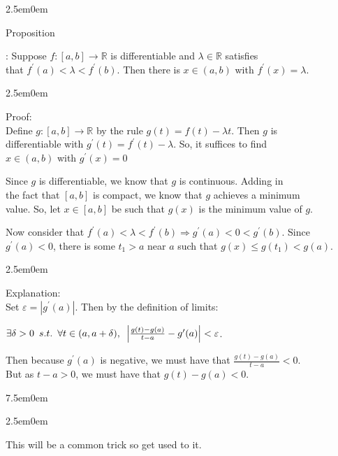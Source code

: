 \documentclass{book}
\newcommand{\hTwo}{%
   \color{MidnightBlue}%
   \fontsize{13}{15}\selectfont%
}
\newcommand{\hThree}{%
   \color{PineGreen!85!Orange}
   \fontsize{13}{15}\selectfont%
}
\newcommand{\hFour}{%
   \color{Cerulean}
   \fontsize{12}{14}\selectfont%
}
\newcommand{\teachComment}{
   \color{Orange}%
   \fontsize{12}{14}\selectfont%
}
\newenvironment{myIndent}{%
   \begin{adjustwidth}{2.5em}{0em}%
}{%
   \end{adjustwidth}%
}
\newenvironment{myTindent}{%
   \begin{adjustwidth}{7.5em}{0em}%
}{%
   \end{adjustwidth}%
}
\newcommand{\suchthat}{ \hspace{0.5em}s.t.\hspace{0.5em}}
\newcommand{\myHS}{ \hspace{0.5em}}
\newcounter{PropNumber}
\newcommand{\propCount}[1][1]{%
   \addtocounter{PropNumber}{#1}%
   \thePropNumber%
}
\newcommand{\retTwo}{\hfill\bigbreak}
\begin{document}
{\begin{myIndent}\hTwo
   Proposition \propCount: Suppose $f: [a, b] \rightarrow \mathbb{R}$ is differentiable and $\lambda \in \mathbb{R}$ satisfies\\ that $f^\prime(a) < \lambda < f^\prime(b)$. Then there is $x \in (a, b)$ with $f^\prime(x) = \lambda$.\\
   
   {\begin{myIndent}\hThree
      Proof:\\
      Define $g: [a, b] \rightarrow \mathbb{R}$ by the rule $g(t) = f(t) - \lambda t$. Then $g$ is\\ differentiable with $g^\prime(t) = f^\prime(t) - \lambda$. So, it suffices to find\\ $x \in (a, b)$ with $g^\prime(x) = 0$\retTwo

      Since $g$ is differentiable, we know that $g$ is continuous. Adding in\\ the fact that $[a, b]$ is compact, we know that $g$ achieves a minimum\\ value. So, let $x \in [a, b]$ be such that $g(x)$ is the minimum value of $g$.\retTwo

      Now consider that $f^\prime(a) < \lambda < f^\prime(b) \Longrightarrow g^\prime(a) < 0 < g^\prime(b)$. Since\\ $g^\prime(a) < 0$, there is some $t_1 > a$ near $a$ such that $g(x) \leq g(t_1) < g(a)$.\\ [-11pt]
      {\begin{myIndent}\hFour
         Explanation:\\
         Set $\varepsilon = |g^\prime(a)|$. Then by the definition of limits:
         
         {\centering $\exists \delta > 0 \suchthat \forall t \in (a, a + \delta), \myHS \left|\frac{g(t)- g(a)}{t - a} - g^\prime(a)\right| < \varepsilon$.\retTwo\par}

         Then because $g^\prime(a)$ is negative, we must have that $\frac{g(t)- g(a)}{t - a} < 0$.\\ But as $t - a > 0$, we must have that $g(t)- g(a) < 0$.
         {\begin{myTindent}\begin{myIndent}\teachComment
            This will be a common trick so get used to it.
         \end{myIndent}\end{myTindent}}
      \end{myIndent}}


\end{myIndent}}
\end{myIndent}}
\end{document}
